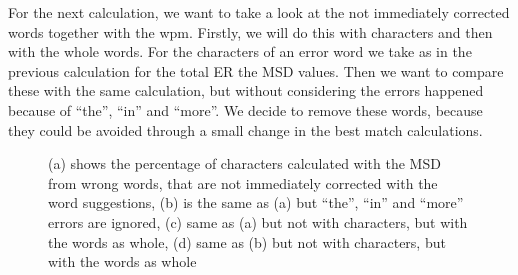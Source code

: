For the next calculation, we want to take a look at the not immediately corrected words together with the wpm. Firstly, we will do this with characters and then with the whole words. For the characters of an error word we take as in the previous calculation for the total ER the MSD values. Then we want to compare these with the same calculation, but without considering the errors happened because of ``the'', ``in'' and ``more''. We decide to remove these words, because they could be avoided through a small change in the best match calculations.
\begin{figure}[H]
    \caption{(a) shows the percentage of characters calculated with the MSD from wrong words, that are not immediately corrected with the word suggestions, (b) is the same as (a) but ``the'', ``in'' and ``more'' errors are ignored, (c) same as (a) but not with characters, but with the words as whole, (d) same as (b) but not with characters, but with the words as whole}
    \label{fig:error_user}
\end{figure}


